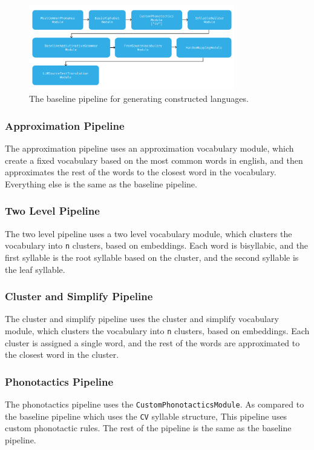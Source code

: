 \begin{figure}
    \centering
    \includegraphics[width=0.8\textwidth]{figures/baseline_pipeline.png}
    \caption{The baseline pipeline for generating constructed languages.}
    \label{fig:baseline_pipeline}
\end{figure}
\subsubsection{Approximation Pipeline}
The approximation pipeline uses an approximation vocabulary module, which create a fixed vocabulary based on the most common words in english, 
and then approximates the rest of the words to the closest word in the vocabulary. Everything else is the same as the baseline pipeline.
\subsubsection{Two Level Pipeline}
The two level pipeline uses a two level vocabulary module, which clusters the vocabulary into \texttt{n} clusters, based on embeddings. Each word is bisyllabic, 
and the first syllable is the root syllable based on the cluster, and the second syllable is the leaf syllable.
\subsubsection{Cluster and Simplify Pipeline}
The cluster and simplify pipeline uses the cluster and simplify vocabulary module, which clusters the vocabulary into \texttt{n} clusters, based on embeddings.
Each cluster is assigned a single word, and the rest of the words are approximated to the closest word in the cluster.
\subsubsection{Phonotactics Pipeline}
The phonotactics pipeline uses the \texttt{CustomPhonotacticsModule}. As compared to the baseline pipeline which uses the \texttt{CV} syllable structure,
This pipeline uses custom phonotactic rules. The rest of the pipeline is the same as the baseline pipeline.


